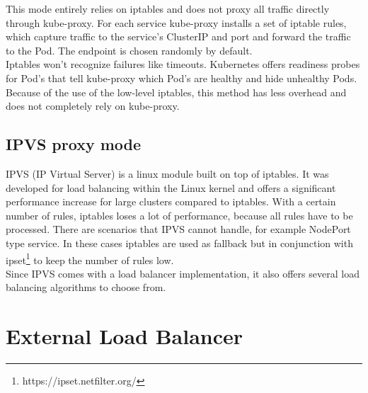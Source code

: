 This mode entirely relies on iptables and does not proxy all traffic directly through kube-proxy.
For each service kube-proxy installs a set of iptable rules, which capture traffic to the service's ClusterIP and port and forward the traffic to the Pod.
The endpoint is chosen randomly by default.
\\
Iptables won't recognize failures like timeouts.
Kubernetes offers readiness probes for Pod's that tell kube-proxy which Pod's are healthy and hide unhealthy Pods.
\\
Because of the use of the low-level iptables, this method has less overhead and does not completely rely on kube-proxy.~\cite{KUBERNETES-SERVICE}

\subsection{IPVS proxy mode}

IPVS (IP Virtual Server) is a linux module built on top of iptables.
It was developed for load balancing within the Linux kernel and offers a significant performance increase for large clusters compared to iptables.
With a certain number of rules, iptables loses a lot of performance, because all rules have to be processed.
There are scenarios that IPVS cannot handle, for example NodePort type service.
In these cases iptables are used as fallback but in conjunction with ipset\footnote{https://ipset.netfilter.org/} to keep the number of rules low.
\\
Since IPVS comes with a load balancer implementation, it also offers several load balancing algorithms to choose from.~\cite{KUBERNETES-SERVICE}

\section{External Load Balancer}\label{sec:ExternalLoadBalancer}

